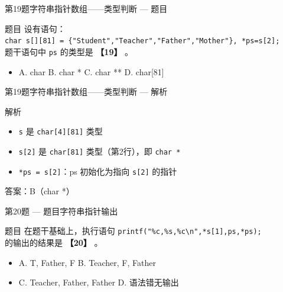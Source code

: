 \begin{frame}{第19题}{字符串指针数组——类型判断 --- 题目}
    \begin{exampleblock}{题目}
        \footnotesize 设有语句：\\
        \texttt{char s[][81] = \{"Student","Teacher","Father","Mother"\}, *ps=s[2];}\\
        题干语句中 \texttt{ps} 的类型是 \textbf{【19】} 。
        \begin{itemize}
            \setlength{\itemsep}{0pt}
            \item A. char \quad B. char * \quad C. char ** \quad D. char[81]
        \end{itemize}
    \end{exampleblock}
\end{frame}

\begin{frame}{第19题}{字符串指针数组——类型判断 --- 解析}
    \begin{alertblock}{解析}
        \footnotesize
        \begin{itemize}
            \setlength{\itemsep}{0pt}
            \item \texttt{s} 是 \texttt{char[4][81]} 类型
            \item \texttt{s[2]} 是 \texttt{char[81]} 类型（第2行），即 \texttt{char *}
            \item \texttt{*ps = s[2]}：ps 初始化为指向 \texttt{s[2]} 的指针
        \end{itemize}
        {\color{highlight}答案：B（char *）}
    \end{alertblock}
\end{frame}

\begin{frame}{第20题 --- 题目}{字符串指针输出}
    \begin{exampleblock}{题目}
        在题干基础上，执行语句 \texttt{printf("\%c,\%s,\%c\textbackslash n",*s[1],ps,*ps);} \\
        的输出的结果是 \textbf{【20】} 。
        \begin{itemize}
            \setlength{\itemsep}{0pt}
            \item A. T, Father, F \quad B. Teacher, F, Father
            \item C. Teacher, Father, Father \quad D. 语法错无输出
        \end{itemize}
    \end{exampleblock}
\end{frame}

